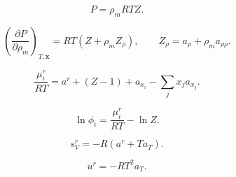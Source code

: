 \documentclass[11pt]{article}
\begin{document}
\begin{equation}
P=\rho_mRTZ.
\label{eq:pressure}
\end{equation}

\begin{equation}
\left(\frac{\partial P}{\partial\rho_m}\right)_{T,\boldsymbol{x}}
=RT\left(Z+\rho_mZ_\rho\right),
\qquad
Z_\rho=a_\rho+\rho_ma_{\rho\rho}.
\label{eq:pressure_density_derivative}
\end{equation}

\begin{equation}
\frac{\mu_i^r}{RT}
=a^r+(Z-1)+a_{x_i}-\sum_jx_ja_{x_j}.
\label{eq:residual_chemical_potential}
\end{equation}

\begin{equation}
\ln\phi_i=\frac{\mu_i^r}{RT}-\ln Z.
\label{eq:log_fugacity_coefficient}
\end{equation}

\begin{equation}
s_V^r=-R\left(a^r+Ta_T\right).
\label{eq:residual_entropy}
\end{equation}

\begin{equation}
u^r=-RT^2a_T.
\label{eq:residual_internal_energy}
\end{equation}
\end{document}
